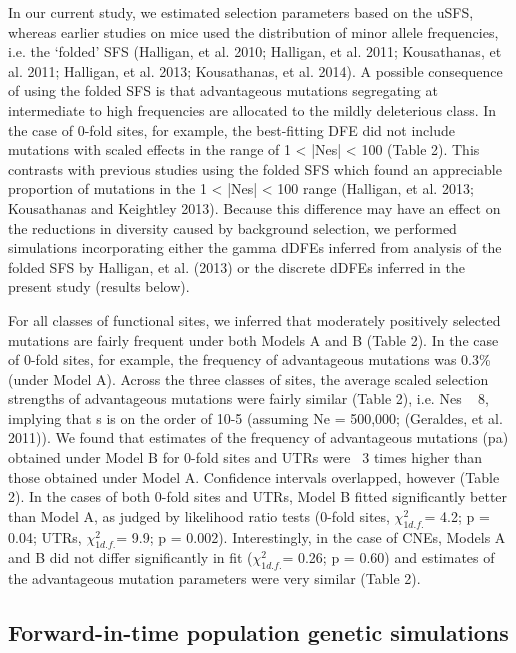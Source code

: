 In our current study, we estimated selection parameters based on the uSFS, whereas earlier studies on mice used the distribution of minor allele frequencies, i.e. the ‘folded’ SFS (Halligan, et al. 2010; Halligan, et al. 2011; Kousathanas, et al. 2011; Halligan, et al. 2013; Kousathanas, et al. 2014). A possible consequence of using the folded SFS is that advantageous mutations segregating at intermediate to high frequencies are allocated to the mildly deleterious class. In the case of 0-fold sites, for example, the best-fitting DFE did not include mutations with scaled effects in the range of 1 < |Nes| < 100 (Table 2). This contrasts with previous studies using the folded SFS which found an appreciable proportion of mutations in the 1 < |Nes| < 100 range (Halligan, et al. 2013; Kousathanas and Keightley 2013). Because this difference may have an effect on the reductions in diversity caused by background selection, we performed simulations incorporating either the gamma dDFEs inferred from analysis of the folded SFS by Halligan, et al. (2013) or the discrete dDFEs inferred in the present study (results below).
 
For all classes of functional sites, we inferred that moderately positively selected mutations are fairly frequent under both Models A and B (Table 2). In the case of 0-fold sites, for example, the frequency of advantageous mutations was 0.3\% (under Model A). Across the three classes of sites, the average scaled selection strengths of advantageous mutations were fairly similar (Table 2), i.e. Nes ~ 8, implying that s is on the order of 10-5 (assuming Ne = 500,000; (Geraldes, et al. 2011)). We found that estimates of the frequency of advantageous mutations (pa) obtained under Model B for 0-fold sites and UTRs were ~3 times higher than those obtained under Model A. Confidence intervals overlapped, however (Table 2). In the cases of both 0-fold sites and UTRs, Model B fitted significantly better than Model A, as judged by likelihood ratio tests (0-fold sites, $\chi^2_{1 d.f.}$= 4.2; p = 0.04; UTRs, $\chi^2_{1 d.f.}$= 9.9; p = 0.002). Interestingly, in the case of CNEs, Models A and B did not differ significantly in fit ($\chi^2_{1 d.f.}$= 0.26; p = 0.60) and estimates of the advantageous mutation parameters were very similar (Table 2). 

\subsection{Forward-in-time population genetic simulations}

